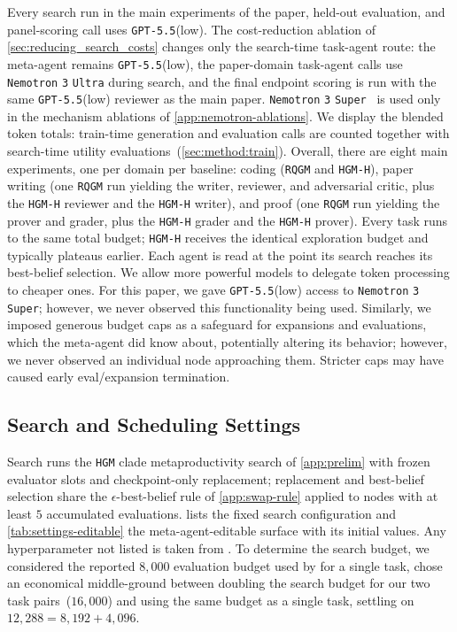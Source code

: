 \documentclass{paper}
\newcommand{\ourmethod}{\texttt{RQGM}\xspace}
\newcommand{\hgm}{\texttt{HGM}\xspace}
\newcommand{\hgmh}{\texttt{HGM-H}\xspace}
\newcommand{\gptlow}{\texttt{GPT-5.5}\xspace}
\newcommand{\nemotron}{\texttt{Nemotron} \texttt{3} \texttt{Super}\xspace}
\newcommand{\nemotronultra}{\texttt{Nemotron} \texttt{3} \texttt{Ultra}\xspace}
\begin{document}
Every search run in the main experiments of the paper, held-out evaluation, and panel-scoring call uses \gptlow (low). The cost-reduction ablation of \cref{sec:reducing_search_costs} changes only the search-time task-agent route: the meta-agent remains \gptlow (low), the paper-domain task-agent calls use \nemotronultra during search, and the final endpoint scoring is run with the same \gptlow (low) reviewer as the main paper. \nemotron~\citep{nemotron_super} is used only in the mechanism ablations of \cref{app:nemotron-ablations}. We display the blended token totals: train-time generation and evaluation calls are counted together with search-time utility evaluations~(\cref{sec:method:train}). Overall, there are eight main experiments, one per domain per baseline: coding (\ourmethod{} and \hgmh), paper writing (one \ourmethod{} run yielding the writer, reviewer, and adversarial critic, plus the \hgmh reviewer and the \hgmh writer), and proof (one \ourmethod{} run yielding the prover and grader, plus the \hgmh grader and the \hgmh prover). Every task runs to the same total budget; \hgmh receives the identical exploration budget and typically plateaus earlier. Each agent is read at the point its search reaches its best-belief selection. We allow more powerful models to delegate token processing to cheaper ones. For this paper, we gave \gptlow (low) access to \nemotron; however, we never observed this functionality being used. Similarly, we imposed generous budget caps as a safeguard for expansions and evaluations, which the meta-agent did know about, potentially altering its behavior; however, we never observed an individual node approaching them. Stricter caps may have caused early eval/expansion termination.

\subsection{Search and Scheduling Settings}
\label{app:hyperparams}

Search runs the \hgm clade metaproductivity search of \cref{app:prelim} with frozen evaluator slots and checkpoint-only replacement; replacement and best-belief selection share the $\epsilon$-best-belief rule of \cref{app:swap-rule} applied to nodes with at least $5$ accumulated evaluations.  lists the fixed search configuration and \cref{tab:settings-editable} the meta-agent-editable surface with its initial values. Any hyperparameter not listed is taken from \citet{wang2025huxley}. To determine the search budget, we considered the reported $8{,}000$ evaluation budget used by \citet{wang2025huxley} for a single task, chose an economical middle-ground between doubling the search budget for our two task pairs~($16{,}000$) and using the same budget as a single task, settling on $12{,}288 = 8{,}192 + 4{,}096$. 
\end{document}
